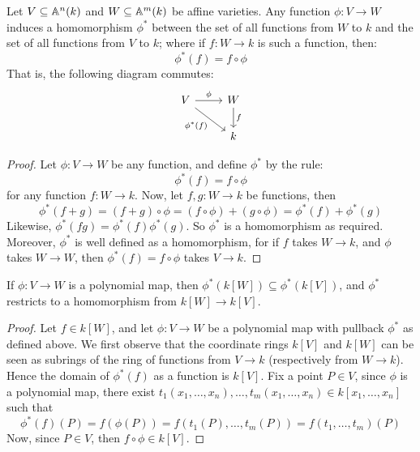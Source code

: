 \begin{proposition}\label{proposition_11.1.5}
  Let $V \subseteq \mathbb{A}^n(k)$ and $W \subseteq \mathbb{A}^m(k)$ be affine
  varieties. Any function $\phi:V \xrightarrow{} W$ induces a
  homomorphism $\phi^*$ between the set of all functions from $W$ to
  $k$ and the set of all functions from $V$ to $k$; where if $f:W
  \xrightarrow{} k$ is such a function, then:
  \begin{equation*}
    \phi^*(f)=f \circ \phi
  \end{equation*}
  That is, the following diagram commutes:
  \[\begin{tikzcd}
    V & W \\
      & k
      \arrow["\phi", from=1-1, to=1-2]
      \arrow["{\phi^*(f)}"', from=1-1, to=2-2]
      \arrow["f", from=1-2, to=2-2]
  \end{tikzcd}\]
\end{proposition}
\begin{proof}
  Let $\phi:V \xrightarrow{} W$ be any function, and define $\phi^*$
  by the rule:
   \begin{equation*}
     \phi^*(f)=f \circ \phi
  \end{equation*}
  for any function $f:W \xrightarrow{} k$. Now, let $f,g:W
  \xrightarrow{} k$ be functions, then
  \begin{equation*}
    \phi^*(f+g)=(f+g) \circ \phi=(f \circ \phi)+(g \circ \phi)=\phi^*(f)+\phi^*(g)
  \end{equation*}
  Likewise, $\phi^*(fg)=\phi^*(f)\phi^*(g)$. So $\phi^*$ is a homomorphism
  as required. Moreover, $\phi^*$ is well defined as a homomorphism,
  for if $f$ takes $W \xrightarrow{} k$, and $\phi$ takes $W
  \xrightarrow{} W$, then $\phi^*(f)=f \circ \phi$ takes $V
  \xrightarrow{} k$.
\end{proof}
\begin{corollary}
  If $\phi:V \xrightarrow{} W$ is a polynomial map, then $\phi^*(k[W])
  \subseteq \phi^*(k[V])$, and $\phi^*$ restricts to a homomorphism from
   $k[W] \xrightarrow{} k[V]$.
\end{corollary}
\begin{proof}
  Let $f \in k[W]$, and let $\phi:V \xrightarrow{} W$ be a
  polynomial map with pullback $\phi^*$ as defined above.
  We first observe that the coordinate rings $k[V]$ and $k[W]$ can
  be seen as subrings of the ring of functions from $V
  \xrightarrow{} k$ (respectively from $W \xrightarrow{} k$). Hence
  the domain of $\phi^*(f)$ as a function is $k[V]$.
  Fix a point $P \in V$, since $\phi$ is a polynomial map, there
  exist $t_1(x_1, \dots, x_n), \dots, t_m(x_1, \dots, x_n) \in
  k[x_1, \dots, x_n]$ such that
  \begin{equation*}
    \phi^*(f)(P)=f(\phi(P))=f(t_1(P), \dots, t_m(P))=
    f(t_1, \dots, t_m)(P)
  \end{equation*}
  Now, since $P \in V$, then $f \circ \phi \in k[V]$.
\end{proof}

